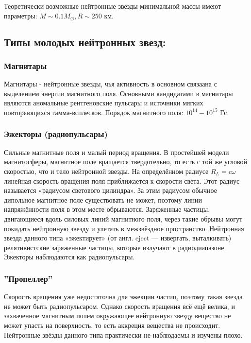 Теоретически возможные нейтронные звезды минимальной массы имеют параметры: $M \sim 0.1 M_\odot, R \sim 250 $ км.

\medskip

\subsection{Типы молодых нейтронных звезд: }

\subsubsection{Магнитары}

Магнитары - нейтронные звезды, чья активность в основном связаана с выделением энергии магнитного поля. Основными кандидатами в магнитары являются аномальные рентгеновские пульсары и источники мягких повторяющихся гамма-всплесков. Порядок магнитного поля: $10^{14}-10^{15}$ Гс.

\subsubsection{Эжекторы (радиопульсары)}
Сильные магнитные поля и малый период вращения. В простейшей модели магнитосферы, магнитное поле вращается твердотельно, то есть с той же угловой скоростью, что и тело нейтронной звезды. На определённом радиусе $ R_{L}=c\omega$ линейная скорость вращения поля приближается к скорости света. Этот радиус называется «радиусом светового цилиндра». За этим радиусом обычное дипольное магнитное поле существовать не может, поэтому линии напряжённости поля в этом месте обрываются. Заряженные частицы, двигающиеся вдоль силовых линий магнитного поля, через такие обрывы могут покидать нейтронную звезду и улетать в межзвёздное пространство. Нейтронная звезда данного типа «эжектирует» (от англ. eject — извергать, выталкивать) релятивистские заряженные частицы, которые излучают в радиодиапазоне. Эжекторы наблюдаются как радиопульсары.

\subsubsection{''Пропеллер''}

Скорость вращения уже недостаточна для эжекции частиц, поэтому такая звезда не может быть радиопульсаром. Однако скорость вращения всё ещё велика, и захваченное магнитным полем окружающее нейтронную звезду вещество не может упасть на поверхность, то есть аккреция вещества не происходит. Нейтронные звёзды данного типа практически не наблюдаемы и изучены плохо.

